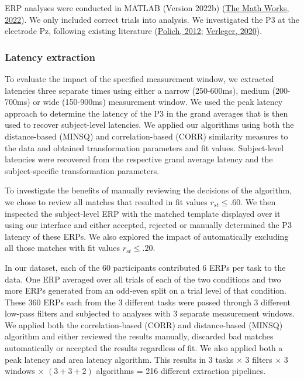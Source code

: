 \documentclass[
  man]{apa7}
\begin{document}
ERP analyses were conducted in MATLAB (Version 2022b) (\protect\hyperlink{ref-matlab2022b}{The Math Works, 2022}). We only included correct trials into analysis. We investigated the P3 at the electrode Pz, following existing literature (\protect\hyperlink{ref-polich2012neuropsychology}{Polich, 2012}; \protect\hyperlink{ref-verleger2020effects}{Verleger, 2020}).

\hypertarget{latency-extraction}{%
\subsubsection{Latency extraction}\label{latency-extraction}}

To evaluate the impact of the specified measurement window, we extracted latencies three separate times using either a narrow (250-600ms), medium (200-700ms) or wide (150-900ms) measurement window. We used the peak latency approach to determine the latency of the P3 in the grand averages that is then used to recover subject-level latencies. We applied our algorithms using both the distance-based (MINSQ) and correlation-based (CORR) similarity measures to the data and obtained transformation parameters and fit values. Subject-level latencies were recovered from the respective grand average latency and the subject-specific transformation parameters.

To investigate the benefits of manually reviewing the decisions of the algorithm, we chose to review all matches that resulted in fit values \(r_{st} \le .60\). We then inspected the subject-level ERP with the matched template displayed over it using our interface and either accepted, rejected or manually determined the P3 latency of these ERPs.
We also explored the impact of automatically excluding all those matches with fit values \(r_{st} \le .20\).

In our dataset, each of the 60 participants contributed 6 ERPs per task to the data. One ERP averaged over all trials of each of the two conditions and two more ERPs generated from an odd-even split on a trial level of that condition. These 360 ERPs each from the 3 different tasks were passed through 3 different low-pass filters and subjected to analyses with 3 separate measurement windows. We applied both the correlation-based (CORR) and distance-based (MINSQ) algorithm and either reviewed the results manually, discarded bad matches automatically or accepted the results regardless of fit. We also applied both a peak latency and area latency algorithm. This results in 3 tasks \(\times\) 3 filters \(\times\) 3 windows \(\times\) \((3 + 3 + 2)\) algorithms = 216 different extraction pipelines.
\end{document}
